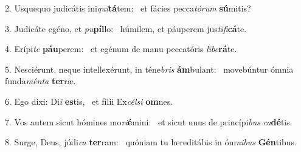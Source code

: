 2. Usquequo judicátis ini\textit{qui}\textbf{tá}tem: \ast\  et fácies pecca\textit{tó}\textit{rum} \textbf{sú}mitis?\

3. Judicáte egéno, et \textit{pu}\textbf{píl}lo: \ast\  húmilem, et páuperem jus\textit{ti}\textit{fi}\textbf{cá}te.\

4. Erípi\textit{te} \textbf{páu}perem: \ast\  et egénum de manu peccatóris \textit{li}\textit{be}\textbf{rá}te.\

5. Nesciérunt, neque intellexérunt, in téne\textit{bris} \textbf{ám}bulant: \ast\  movebúntur ómnia funda\textit{mén}\textit{ta} \textbf{ter}ræ.\

6. Ego dixi: Di\textit{i} \textbf{es}tis, \ast\  et fílii Ex\textit{cél}\textit{si} \textbf{om}nes.\

7. Vos autem sicut hómines mo\textit{ri}\textbf{é}mini: \ast\  et sicut unus de princípi\textit{bus} \textit{ca}\textbf{dé}tis.\

8. Surge, Deus, júdi\textit{ca} \textbf{ter}ram: \ast\  quóniam tu hereditábis in óm\textit{ni}\textit{bus} \textbf{Gén}tibus.\

